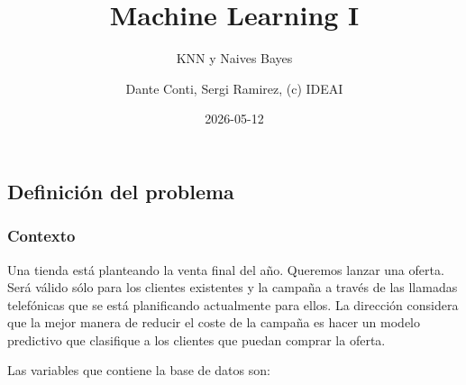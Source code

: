 \documentclass[
  letterpaper,
  DIV=11,
  numbers=noendperiod]{scrartcl}
\title{Machine Learning I}
\subtitle{KNN y Naives Bayes}
\author{Dante Conti, Sergi Ramirez, (c) IDEAI}
\date{2026-05-12}
\renewcommand*\contentsname{Table of contents}
\newcommand\contentsname{Table of contents}
\begin{document}
\maketitle

\renewcommand*\contentsname{Table of contents}
{
\hypersetup{linkcolor=}
\setcounter{tocdepth}{3}
\tableofcontents
}

\subsection{Definición del problema}\label{definiciuxf3n-del-problema}

\subsubsection{Contexto}\label{contexto}

Una tienda está planteando la venta final del año. Queremos lanzar una
oferta. Será válido sólo para los clientes existentes y la campaña a
través de las llamadas telefónicas que se está planificando actualmente
para ellos. La dirección considera que la mejor manera de reducir el
coste de la campaña es hacer un modelo predictivo que clasifique a los
clientes que puedan comprar la oferta.

Las variables que contiene la base de datos son:
\end{document}
